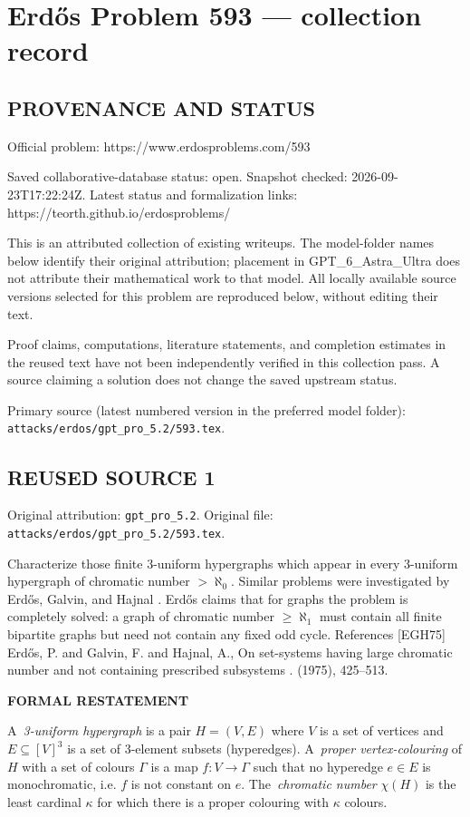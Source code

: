 \section*{Erd\H{o}s Problem 593 --- collection record}

\subsection*{PROVENANCE AND STATUS}
Official problem: https://www.erdosproblems.com/593

Saved collaborative-database status: open.
Snapshot checked: 2026-09-23T17:22:24Z.
Latest status and formalization links: https://teorth.github.io/erdosproblems/

This is an attributed collection of existing writeups. The model-folder names below identify their original attribution; placement in GPT\_6\_Astra\_Ultra does not attribute their mathematical work to that model. All locally available source versions selected for this problem are reproduced below, without editing their text.

Proof claims, computations, literature statements, and completion estimates in the reused text have not been independently verified in this collection pass. A source claiming a solution does not change the saved upstream status.

Primary source (latest numbered version in the preferred model folder): \texttt{attacks/erdos/gpt\_pro\_5.2/593.tex}.

\subsection*{REUSED SOURCE 1}
Original attribution: \texttt{gpt\_pro\_5.2}.
Original file: \texttt{attacks/erdos/gpt\_pro\_5.2/593.tex}.


Characterize those finite 3-uniform hypergraphs which appear in every 3-uniform hypergraph of chromatic number $>\aleph_0$. Similar problems were investigated by Erd\H{o}s, Galvin, and Hajnal \cite{EGH75}. Erd\H{o}s claims that for graphs the problem is completely solved: a graph of chromatic number $\geq \aleph_1$ must contain all finite bipartite graphs but need not contain any fixed odd cycle. References [EGH75] Erd\H{o}s, P. and Galvin, F. and Hajnal, A., On set-systems having large chromatic number and not containing prescribed subsystems . (1975), 425--513.

\bigskip
\noindent\textbf{FORMAL RESTATEMENT}

A \,\emph{3-uniform hypergraph} is a pair $H=(V,E)$ where $V$ is a set of vertices and $E\subseteq [V]^3$ is a set of 3-element subsets (hyperedges).
A \,\emph{proper vertex-colouring} of $H$ with a set of colours $\Gamma$ is a map $f:V\to\Gamma$ such that no hyperedge $e\in E$ is monochromatic, i.e. $f$ is not constant on $e$.
The \,\emph{chromatic number} $\chi(H)$ is the least cardinal $\kappa$ for which there is a proper colouring with $\kappa$ colours.

